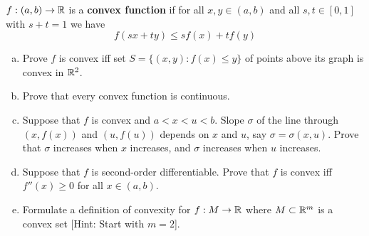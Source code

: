 \documentclass[a4paper, 11pt]{article}
\begin{document}
\begin{problem} [1.30]
$f: (a, b) \to \mathbb{R}$ is a \textbf{convex function} if for all $x, y \in (a, b)$ and all $s, t \in [0,1]$ with $s + t = 1$ we have \[
f(sx + ty) \leq s f(x) + t f(y)
\]
\begin{enumerate} [(a)]
    \item Prove $f$ is convex iff set $S = \{(x, y): f(x) \leq y\}$ of points above its graph is convex in $\mathbb{R}^2$. 
    \item Prove that every convex function is continuous.
    \item Suppose that $f$ is convex and $a < x < u < b$. Slope $\sigma$ of the line through $(x, f(x))$ and $(u, f(u))$ depends on $x$ and $u$, say $\sigma = \sigma(x, u)$. Prove that $\sigma$ increases when $x$ increases, and $\sigma$ increases when $u$ increases.
    \item Suppose that $f$ is second-order differentiable. Prove that $f$ is convex iff $f''(x) \geq 0$ for all $x \in (a, b)$.
    \item Formulate a definition of convexity for $f: M \to \mathbb{R}$ where $M \subset \mathbb{R}^m$ is a convex set [Hint: Start with $m=2$].
\end{enumerate}
\end{problem}
\end{document}
